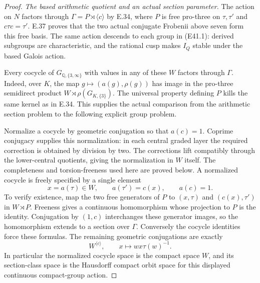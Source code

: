 \begin{proof}
\emph{The based arithmetic quotient and an actual section parameter.}
The action on $N$ factors through
$\Gamma=P\rtimes\langle c\rangle$ by E.34, where
$P$ is free pro-three on $\tau,\tau'$ and
$c\tau c=\tau'$. E.37 proves that the two actual
conjugate Frobenii above seven form this free basis.
The same action descends to each group in (E41.1):
derived subgroups are characteristic, and the rational
cusp makes $I_Q$ stable under the based Galois action.

Every cocycle of $G_{\mathbb Q,\{3,\infty\}}$ with
values in any of these $W$ factors through $\Gamma$.
Indeed, over $K$, the map
$g\mapsto(a(g),\rho(g))$ has image in the pro-three
semidirect product $W\rtimes\rho(G_{K,\{3\}})$.
The universal property defining $P$ kills the same
kernel as in E.34. This supplies the actual comparison
from the arithmetic section problem to the following
explicit group problem.

Normalize a cocycle by geometric conjugation so that
$a(c)=1$. Coprime conjugacy supplies this normalization:
in each central graded layer the required correction
is obtained by division by two. The corrections lift
compatibly through the lower-central quotients, giving
the normalization in $W$ itself. The completeness and
torsion-freeness used here are proved below.
A normalized cocycle is freely specified by a single
element
\[
 x=a(\tau)\in W,\qquad a(\tau')=c(x),\qquad a(c)=1.
 \tag{E41.9}
\]
To verify existence, map the two free generators of
$P$ to $(x,\tau)$ and $(c(x),\tau')$ in
$W\rtimes P$. Freeness gives a continuous homomorphism
whose projection to $P$ is the identity. Conjugation
by $(1,c)$ interchanges these generator images, so the
homomorphism extends to a section over $\Gamma$.
Conversely the cocycle identities force these formulas.
The remaining geometric conjugations are exactly
\[
 W^{\langle c\rangle},\qquad
          x\longmapsto w x\tau(w)^{-1}.
 \tag{E41.10}
\]
In particular the normalized cocycle space is the
compact space $W$, and its section-class space is
the Hausdorff compact orbit space for this displayed
continuous compact-group action.


\end{proof}
